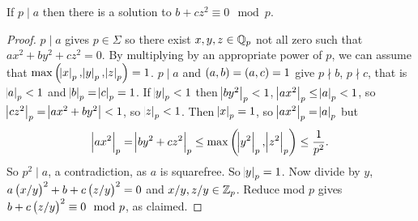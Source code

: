 \pagebreak


\begin{lemma}
If $ p \mid a $ then there is a solution to $ b + cz^2 \equiv 0 \mod p $.
\end{lemma}

\begin{proof}
$ p \mid a $ gives $ p \in \Sigma $ so there exist $ x, y, z \in \mathbb{Q}_p $ not all zero such that $ ax^2 + by^2 + cz^2 = 0 $. By multiplying by an appropriate power of $ p $, we can assume that $ \max\br{\abs{x}_p, \abs{y}_p, \abs{z}_p} = 1 $. $ p \mid a $ and $ \br{a, b} = \br{a, c} = 1 $ give $ p \nmid b $, $ p \nmid c $, that is $ \abs{a}_p < 1 $ and $ \abs{b}_p = \abs{c}_p = 1 $. If $ \abs{y}_p < 1 $ then $ \abs{by^2}_p < 1 $, $ \abs{ax^2}_p \le \abs{a}_p < 1 $, so $ \abs{cz^2}_p = \abs{ax^2 + by^2} < 1 $, so $ \abs{z}_p < 1 $. Then $ \abs{x}_p = 1 $, so $ \abs{ax^2}_p = \abs{a}_p $ but
$$ \abs{ax^2}_p = \abs{by^2 + cz^2}_p \le \max\br{\abs{y^2}_p, \abs{z^2}_p} \le \dfrac{1}{p^2}. $$
So $ p^2 \mid a $, a contradiction, as $ a $ is squarefree. So $ \abs{y}_p = 1 $. Now divide by $ y $, $ a\br{x / y}^2 + b + c\br{z / y}^2 = 0 $ and $ x / y, z / y \in \mathbb{Z}_p $. Reduce mod $ p $ gives $ b + c\br{z / y}^2 \equiv 0 \mod p $, as claimed.
\end{proof}

